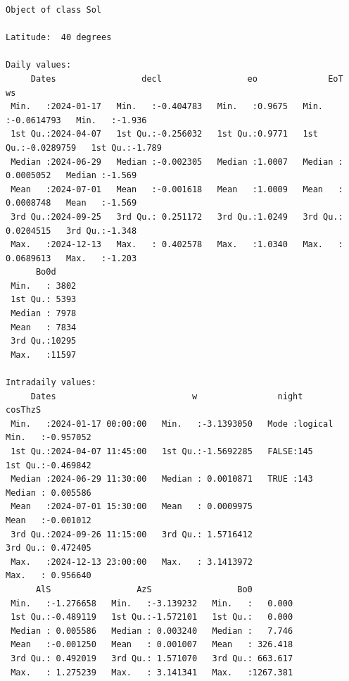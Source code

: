 \begin{verbatim}
Object of class Sol 

Latitude:  40 degrees

Daily values:
     Dates                 decl                 eo              EoT                   ws        
 Min.   :2024-01-17   Min.   :-0.404783   Min.   :0.9675   Min.   :-0.0614793   Min.   :-1.936  
 1st Qu.:2024-04-07   1st Qu.:-0.256032   1st Qu.:0.9771   1st Qu.:-0.0289759   1st Qu.:-1.789  
 Median :2024-06-29   Median :-0.002305   Median :1.0007   Median : 0.0005052   Median :-1.569  
 Mean   :2024-07-01   Mean   :-0.001618   Mean   :1.0009   Mean   : 0.0008748   Mean   :-1.569  
 3rd Qu.:2024-09-25   3rd Qu.: 0.251172   3rd Qu.:1.0249   3rd Qu.: 0.0204515   3rd Qu.:-1.348  
 Max.   :2024-12-13   Max.   : 0.402578   Max.   :1.0340   Max.   : 0.0689613   Max.   :-1.203  
      Bo0d      
 Min.   : 3802  
 1st Qu.: 5393  
 Median : 7978  
 Mean   : 7834  
 3rd Qu.:10295  
 Max.   :11597  

Intradaily values: 
     Dates                           w                night            cosThzS         
 Min.   :2024-01-17 00:00:00   Min.   :-3.1393050   Mode :logical   Min.   :-0.957052  
 1st Qu.:2024-04-07 11:45:00   1st Qu.:-1.5692285   FALSE:145       1st Qu.:-0.469842  
 Median :2024-06-29 11:30:00   Median : 0.0010871   TRUE :143       Median : 0.005586  
 Mean   :2024-07-01 15:30:00   Mean   : 0.0009975                   Mean   :-0.001012  
 3rd Qu.:2024-09-26 11:15:00   3rd Qu.: 1.5716412                   3rd Qu.: 0.472405  
 Max.   :2024-12-13 23:00:00   Max.   : 3.1413972                   Max.   : 0.956640  
      AlS                 AzS                 Bo0          
 Min.   :-1.276658   Min.   :-3.139232   Min.   :   0.000  
 1st Qu.:-0.489119   1st Qu.:-1.572101   1st Qu.:   0.000  
 Median : 0.005586   Median : 0.003240   Median :   7.746  
 Mean   :-0.001250   Mean   : 0.001007   Mean   : 326.418  
 3rd Qu.: 0.492019   3rd Qu.: 1.571070   3rd Qu.: 663.617  
 Max.   : 1.275239   Max.   : 3.141341   Max.   :1267.381
\end{verbatim}


